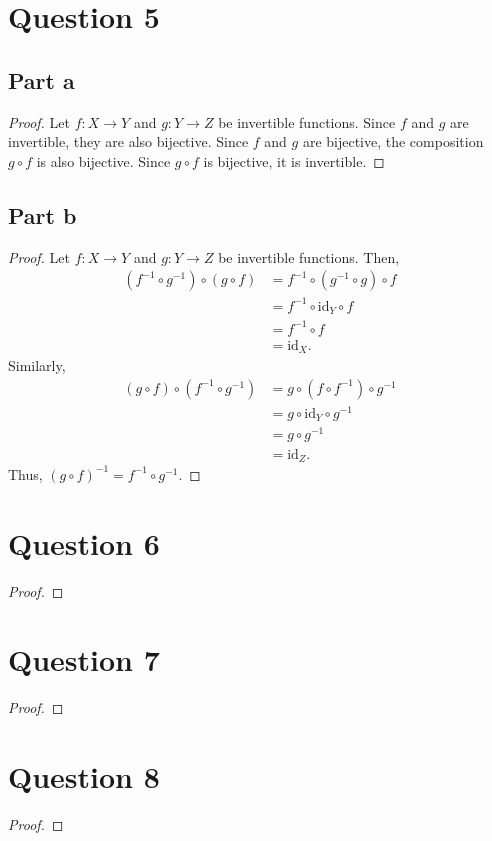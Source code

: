 \documentclass{article}
\begin{document}
\section*{Question 5}

\subsection*{Part a}
\begin{proof}
    Let $f: X \to Y$ and $g: Y \to Z$ be invertible functions.
    Since $f$ and $g$ are invertible, they are also bijective.
    Since $f$ and $g$ are bijective, the composition $g \circ f$ is also bijective.
    Since $g \circ f$ is bijective, it is invertible.
\end{proof}

\subsection*{Part b}
\begin{proof}
    Let $f: X \to Y$ and $g: Y \to Z$ be invertible functions.
    Then,
    \begin{align*}
        (f^{-1} \circ g^{-1}) \circ (g \circ f) &= f^{-1} \circ (g^{-1} \circ g) \circ f \\
        &= f^{-1} \circ \text{id}_Y \circ f \\
        &= f^{-1} \circ f \\
        &= \text{id}_X.
    \end{align*}
    Similarly,
    \begin{align*}
        (g \circ f) \circ (f^{-1} \circ g^{-1}) &= g \circ (f \circ f^{-1}) \circ g^{-1} \\
        &= g \circ \text{id}_Y \circ g^{-1} \\
        &= g \circ g^{-1} \\
        &= \text{id}_Z.
    \end{align*}
    Thus, $(g \circ f)^{-1} = f^{-1} \circ g^{-1}$.
\end{proof}

\section*{Question 6}
\begin{proof}

\end{proof}

\section*{Question 7}
\begin{proof}

\end{proof}

\section*{Question 8}
\begin{proof}

\end{proof}
\end{document}
